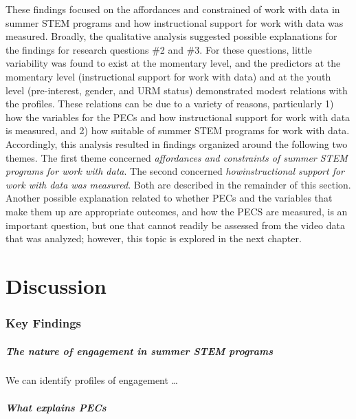 \documentclass[]{msu-thesis}
\let\oldparagraph\paragraph
\renewcommand{\paragraph}[1]{\oldparagraph{#1}\mbox{}}
\theoremstyle{definition}
\theoremstyle{definition}
\theoremstyle{definition}
\theoremstyle{remark}
\begin{document}
These findings focused on the affordances and constrained of work with
data in summer STEM programs and how instructional support for work with
data was measured. Broadly, the qualitative analysis suggested possible
explanations for the findings for research questions \#2 and \#3. For
these questions, little variability was found to exist at the momentary
level, and the predictors at the momentary level (instructional support
for work with data) and at the youth level (pre-interest, gender, and
URM status) demonstrated modest relations with the profiles. These
relations can be due to a variety of reasons, particularly 1) how the
variables for the PECs and how instructional support for work with data
is measured, and 2) how suitable of summer STEM programs for work with
data. Accordingly, this analysis resulted in findings organized around
the following two themes. The first theme concerned \emph{affordances
and constraints of summer STEM programs for work with data}. The second
concerned \emph{howinstructional support for work with data was
measured}. Both are described in the remainder of this section. Another
possible explanation related to whether PECs and the variables that make
them up are appropriate outcomes, and how the PECS are measured, is an
important question, but one that cannot readily be assessed from the
video data that was analyzed; however, this topic is explored in the
next chapter.

\chapter{Discussion}\label{discussion}

\subsection{Key Findings}\label{key-findings}

\paragraph{The nature of engagement in summer STEM
programs}\label{the-nature-of-engagement-in-summer-stem-programs}

We can identify profiles of engagement \ldots{}

\paragraph{What explains PECs}\label{what-explains-pecs}
\end{document}
